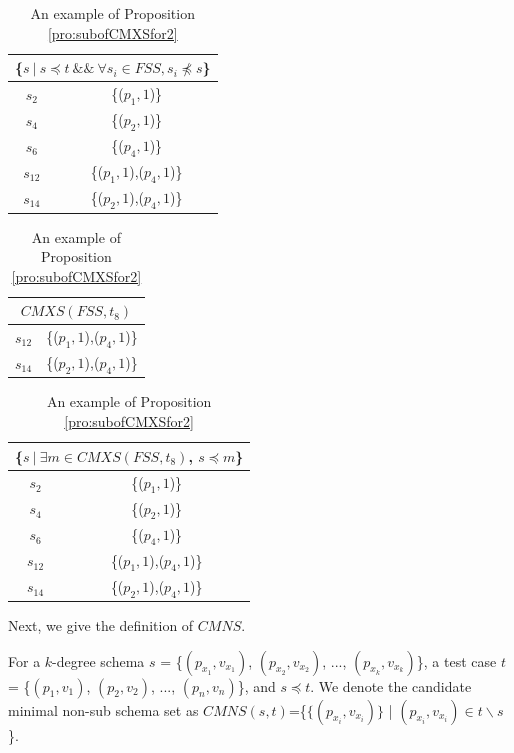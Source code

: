  \begin{table}[htbp]
  \centering
  \caption{An example of Proposition \ref{pro:subofCMXSfor2}}
  \label{examleOfCMXSPro2}
    \begin{tabular}{|c|c|} \hline
     \multicolumn{2}{|c|}{\{$s\ |\ s \preceq t\ \&\&\ \forall s_{i} \in FSS, s_{i} \npreceq s $\}} \\ \hline
   $s_{2}$ & \{($p_{1}, 1$)\} \\
   $s_{4}$ & \{($p_{2}, 1$)\} \\
   $s_{6}$ & \{($p_{4}, 1$)\} \\
   $s_{12}$ & \{($p_{1}, 1$),($p_{4}, 1$)\} \\
   $s_{14}$ & \{($p_{2}, 1$),($p_{4}, 1$)\} \\  \hline
    \end{tabular}%
\quad
    \begin{tabular}{|c|c|} \hline
     \multicolumn{2}{|c|}{$CMXS(FSS, t_{8})$} \\ \hline
   $s_{12}$ & \{($p_{1}, 1$),($p_{4}, 1$)\} \\
   $s_{14}$ & \{($p_{2}, 1$),($p_{4}, 1$)\} \\
    \hline
    \end{tabular}%
\quad
    \begin{tabular}{|c|c|} \hline
   \multicolumn{2}{|c|}{\{$ s\ |\ \exists m \in CMXS(FSS, t_{8})$, $s \preceq m$\}}\\ \hline
   $s_{2}$ & \{($p_{1}, 1$)\} \\
   $s_{4}$ & \{($p_{2}, 1$)\} \\
   $s_{6}$ & \{($p_{4}, 1$)\} \\
   $s_{12}$ & \{($p_{1}, 1$),($p_{4}, 1$)\} \\
   $s_{14}$ & \{($p_{2}, 1$),($p_{4}, 1$)\} \\  \hline
    \end{tabular}%
\end{table}


Next, we give the definition of $CMNS$.

\begin{definition}
For a $k$-degree schema $s$ = \{$(p_{x_{1}}, v_{x_{1}})$, $(p_{x_{2}}, v_{x_{2}})$, ..., $(p_{x_{k}}, v_{x_{k}})$\}, a test case $t$ = \{$(p_{1}, v_{1})$, $(p_{2}, v_{2})$, ..., $(p_{n}, v_{n})$\}, and $s \preceq t$. We denote the candidate minimal non-sub schema set as $CMNS(s,t)$=\{$\{(p_{x_{i}}, v_{x_{i}})\}$ | $(p_{x_{i}}, v_{x_{i}}) \in t \backslash s $\}.
\end{definition}

